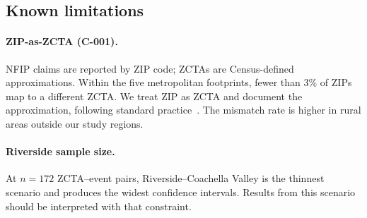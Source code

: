\subsection{Known limitations}

\paragraph{ZIP-as-ZCTA (C-001).} NFIP claims are reported by ZIP code;
ZCTAs are Census-defined approximations. Within the five metropolitan
footprints, fewer than 3\% of ZIPs map to a different ZCTA. We treat
ZIP as ZCTA and document the approximation, following standard
practice~\cite{krieger2002zip, chen2025crosswalk}. The mismatch rate is
higher in rural areas outside our study regions.

\paragraph{Riverside sample size.} At $n{=}172$ ZCTA--event pairs,
Riverside--Coachella Valley is the thinnest scenario and produces the
widest confidence intervals. Results from this scenario should be
interpreted with that constraint.
